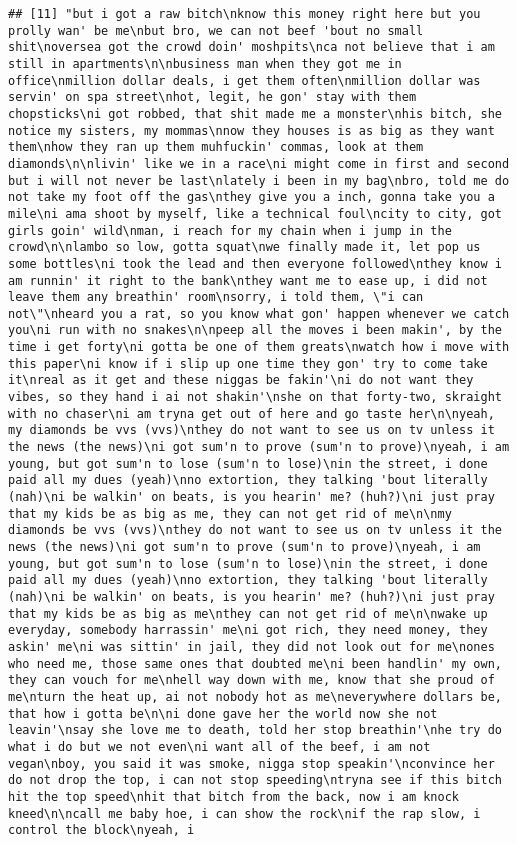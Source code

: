 \documentclass[]{article}
\begin{document}
\begin{verbatim}
## [11] "but i got a raw bitch\nknow this money right here but you prolly wan' be me\nbut bro, we can not beef 'bout no small shit\noversea got the crowd doin' moshpits\nca not believe that i am still in apartments\n\nbusiness man when they got me in office\nmillion dollar deals, i get them often\nmillion dollar was servin' on spa street\nhot, legit, he gon' stay with them chopsticks\ni got robbed, that shit made me a monster\nhis bitch, she notice my sisters, my mommas\nnow they houses is as big as they want them\nhow they ran up them muhfuckin' commas, look at them diamonds\n\nlivin' like we in a race\ni might come in first and second but i will not never be last\nlately i been in my bag\nbro, told me do not take my foot off the gas\nthey give you a inch, gonna take you a mile\ni ama shoot by myself, like a technical foul\ncity to city, got girls goin' wild\nman, i reach for my chain when i jump in the crowd\n\nlambo so low, gotta squat\nwe finally made it, let pop us some bottles\ni took the lead and then everyone followed\nthey know i am runnin' it right to the bank\nthey want me to ease up, i did not leave them any breathin' room\nsorry, i told them, \"i can not\"\nheard you a rat, so you know what gon' happen whenever we catch you\ni run with no snakes\n\npeep all the moves i been makin', by the time i get forty\ni gotta be one of them greats\nwatch how i move with this paper\ni know if i slip up one time they gon' try to come take it\nreal as it get and these niggas be fakin'\ni do not want they vibes, so they hand i ai not shakin'\nshe on that forty-two, skraight with no chaser\ni am tryna get out of here and go taste her\n\nyeah, my diamonds be vvs (vvs)\nthey do not want to see us on tv unless it the news (the news)\ni got sum'n to prove (sum'n to prove)\nyeah, i am young, but got sum'n to lose (sum'n to lose)\nin the street, i done paid all my dues (yeah)\nno extortion, they talking 'bout literally (nah)\ni be walkin' on beats, is you hearin' me? (huh?)\ni just pray that my kids be as big as me, they can not get rid of me\n\nmy diamonds be vvs (vvs)\nthey do not want to see us on tv unless it the news (the news)\ni got sum'n to prove (sum'n to prove)\nyeah, i am young, but got sum'n to lose (sum'n to lose)\nin the street, i done paid all my dues (yeah)\nno extortion, they talking 'bout literally (nah)\ni be walkin' on beats, is you hearin' me? (huh?)\ni just pray that my kids be as big as me\nthey can not get rid of me\n\nwake up everyday, somebody harrassin' me\ni got rich, they need money, they askin' me\ni was sittin' in jail, they did not look out for me\nones who need me, those same ones that doubted me\ni been handlin' my own, they can vouch for me\nhell way down with me, know that she proud of me\nturn the heat up, ai not nobody hot as me\neverywhere dollars be, that how i gotta be\n\ni done gave her the world now she not leavin'\nsay she love me to death, told her stop breathin'\nhe try do what i do but we not even\ni want all of the beef, i am not vegan\nboy, you said it was smoke, nigga stop speakin'\nconvince her do not drop the top, i can not stop speeding\ntryna see if this bitch hit the top speed\nhit that bitch from the back, now i am knock kneed\n\ncall me baby hoe, i can show the rock\nif the rap slow, i control the block\nyeah, i 
\end{verbatim}
\end{document}
